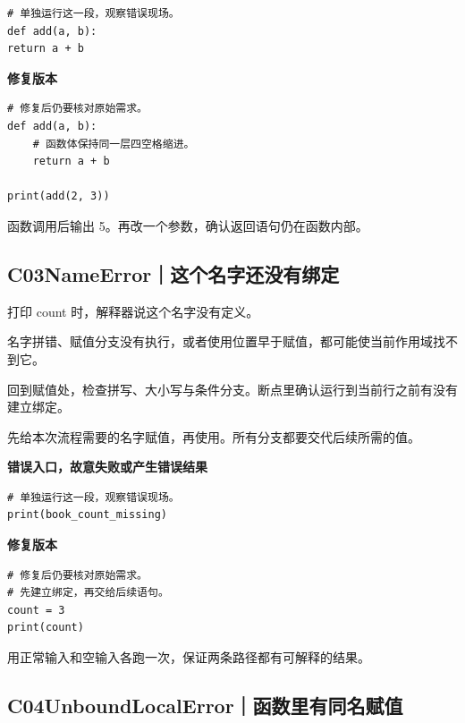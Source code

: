 \documentclass[UTF8,a4paper,oneside,openany,fontset=none,11pt]{ctexbook}
\newcommand{\code}[1]{\texttt{\detokenize{#1}}}
\newcommand{\CaseStep}[2]{\par\smallskip{\bfseries\color{Muted}#1}\enspace #2\par}
\begin{document}
\begin{lstlisting}[style=errorcode,title={错误复现（故意失败或错误结果）：\code{case_02_bad.py.txt}}]
# 单独运行这一段，观察错误现场。
def add(a, b):
return a + b
\end{lstlisting}

\textbf{修复版本}

\begin{lstlisting}[title={\code{case_02.py}}]
# 修复后仍要核对原始需求。
def add(a, b):
    # 函数体保持同一层四空格缩进。
    return a + b

print(add(2, 3))
\end{lstlisting}

\CaseStep{复验}{函数调用后输出 5。再改一个参数，确认返回语句仍在函数内部。}

\subsection*{C03\enspace NameError｜这个名字还没有绑定}

\CaseStep{现象}{打印 count 时，解释器说这个名字没有定义。}

\CaseStep{原因}{名字拼错、赋值分支没有执行，或者使用位置早于赋值，都可能使当前作用域找不到它。}

\CaseStep{排查}{回到赋值处，检查拼写、大小写与条件分支。断点里确认运行到当前行之前有没有建立绑定。}

\CaseStep{修复}{先给本次流程需要的名字赋值，再使用。所有分支都要交代后续所需的值。}

\textbf{错误入口，故意失败或产生错误结果}

\begin{lstlisting}[style=errorcode,title={错误复现（故意失败或错误结果）：\code{case_03_bad.py.txt}}]
# 单独运行这一段，观察错误现场。
print(book_count_missing)
\end{lstlisting}

\textbf{修复版本}

\begin{lstlisting}[title={\code{case_03.py}}]
# 修复后仍要核对原始需求。
# 先建立绑定，再交给后续语句。
count = 3
print(count)
\end{lstlisting}

\CaseStep{复验}{用正常输入和空输入各跑一次，保证两条路径都有可解释的结果。}

\subsection*{C04\enspace UnboundLocalError｜函数里有同名赋值}
\end{document}
